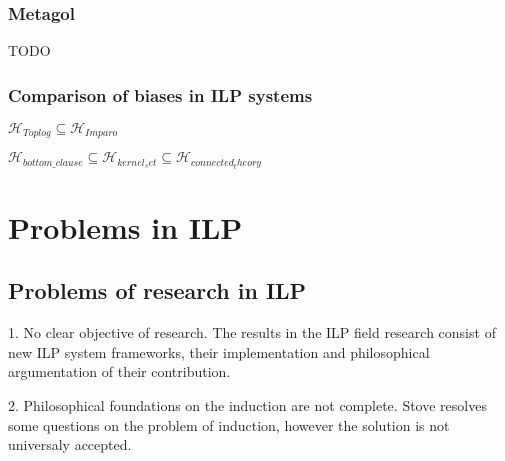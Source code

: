 \subsection{Metagol}
TODO


\subsection{Comparison of biases in ILP systems}
$\mathcal{H}_{Toplog} \subseteq \mathcal{H}_{Imparo}$

$\mathcal{H}_{bottom\_clause} \subseteq \mathcal{H}_{kernel_set} \subseteq \mathcal{H}_{connected_theory}$

\chapter{Problems in ILP}

\iffalse
\chapter{Learning the reality}
It is important to understand how powerful our ILP systems are - what models they are capable of learning and what models they are never going to learn from the given data.
\section{Philosophical discussion}
In order to learn the reality, do we want to induce questions or theories of the models of the observations and the background knowledge? We could use all the observations to reason about the world, but the observations may be too numerous, hence a more compact theory axiomatization would be useful.
Why do we ask a question $Q$? That is so that we would find out what observation we should make. It is in the case that an environment oracle is available.
\fi
\section{Problems of research in ILP}
1. No clear objective of research. The results in the ILP field research consist of new ILP system frameworks, their implementation and philosophical argumentation of their contribution.

2. Philosophical foundations on the induction are not complete. Stove \cite{stove1986} resolves some questions on the problem of induction, however the solution is not universaly accepted.

